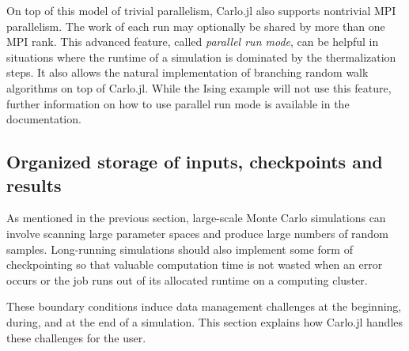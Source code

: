 \documentclass{SciPost}
\begin{document}
On top of this model of trivial parallelism, Carlo.jl also supports nontrivial MPI parallelism. The work of each run may optionally be shared by more than one MPI rank. This advanced feature, called \textit{parallel run mode}, can be helpful in situations where the runtime of a simulation is dominated by the thermalization steps. It also allows the natural implementation of branching random walk algorithms on top of Carlo.jl. While the Ising example will not use this feature, further information on how to use parallel run mode is available in the documentation.
\subsection{Organized storage of inputs, checkpoints and results}
As mentioned in the previous section, large-scale Monte Carlo simulations can involve scanning large parameter spaces and produce large numbers of random samples. Long-running simulations should also implement some form of checkpointing so that valuable computation time is not wasted when an error occurs or the job runs out of its allocated runtime on a computing cluster. 

These boundary conditions induce data management challenges at the beginning, during, and at the end of a simulation. This section explains how Carlo.jl handles these challenges for the user.
\end{document}
